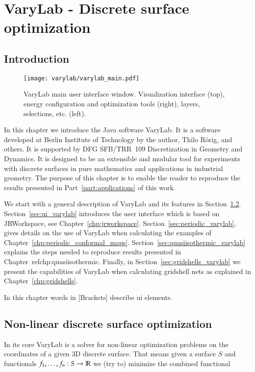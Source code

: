 \documentclass[Thesis.tex]{subfiles}
\begin{document}
\chapter{{\sc VaryLab} - Discrete surface optimization}
\label{chp:varylab}

\section{Introduction}

\begin{figure}
    \begin{center}
    \texttt{[image: varylab/varylab\_main.pdf]}
    \caption{{\sc VaryLab} main user interface window. Visualization interface (top), energy configuration and optimization tools (right), layers, selections, etc. (left).}
    \label{fig:varylab_main_ui}
    \end{center}
\end{figure}

In this chapter we introduce the {\sc Java} software {\sc VaryLab}. It is a software developed at Berlin Institute of Technology by the author, Thilo R\"orig, and others. It is supported by DFG \mbox{SFB/TRR}~109 Discretization in Geometry and Dynamics. It is designed to be an extensible and modular tool for experiments with discrete surfaces in pure mathematics and applications in industrial geometry. The purpose of this chapter is to enable the reader to reproduce the results presented in Part~\ref{part:applications} of this work.

We start with a general description of {\sc VaryLab} and its features in Section~\ref{sec:general_varylab}. Section~\ref{sec:ui_varylab} introduces the user interface which is based on {\sc JRWorkspace}, see Chapter~\ref{chp:jrworkspace}. Section~\ref{sec:periodic_varylab}, gives details on the use of {\sc VaryLab} when calculating the examples of Chapter~\ref{chp:periodic_conformal_maps}. Section~\ref{sec:quasiisothermic_varylab} explains the steps needed to reproduce results presented in Chapter~ref{chp:quasiisothermic}. Finally, in Section~\ref{sec:gridshells_varylab} we present the capabilities of {\sc VaryLab} when calculating gridshell nets as explained in Chapter~\ref{chp:gridshells}.

In this chapter words in [Brackets] describe ui elements.

\section{Non-linear discrete surface optimization}
\label{sec:general_varylab}
In its core {\sc VaryLab} is a solver for non-linear optimization problems on the coordinates of a given 3D discrete surface. That means given a surface $S$ and functionals $f_1,\ldots,f_n:S\to\mathbb R$ we (try to) minimize the combined functional
\end{document}
